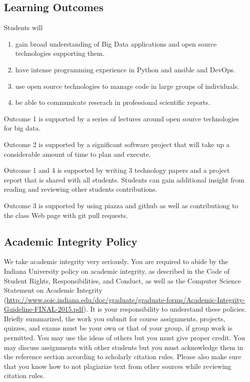 \subsection{Learning Outcomes}
\label{\detokenize{i524/index:learning-outcomes}}
Students will
\begin{enumerate}
\item {} 
gain broad understanding of Big Data applications and open source
technologies supporting them.

\item {} 
have intense programming experience in Python and ansible and DevOps.

\item {} 
use open source technologies to manage code in large groups of
individuals.

\item {} 
be able to communicate reserach in professional scientific reports.

\end{enumerate}

Outcome 1 is supported by a series of lectures around open source
technologies for big data.

Outcome 2 is supported by a significant software project that will
take up a considerable amount of time to plan and execute.

Outcome 1 and 4 is supported by writing 3 technology papers and a project
report that is shared with all students. Students can gain additional
insight from reading and reviewing other students contributions.

Outcome 3 is supported by using piazza and github as well as
contributiong to the class Web page with git pull requests.


\subsection{Academic Integrity Policy}
\label{\detokenize{i524/index:academic-integrity-policy}}
We take academic integrity very seriously. You are required to abide
by the Indiana University policy on academic integrity, as described
in the Code of Student Rights, Responsibilities, and Conduct, as well
as the Computer Science Statement on Academic Integrity
(\url{http://www.soic.indiana.edu/doc/graduate/graduate-forms/Academic-Integrity-Guideline-FINAL-2015.pdf}). It
is your responsibility to understand these policies. Briefly
summarized, the work you submit for course assignments, projects,
quizzes, and exams must be your own or that of your group, if group
work is permitted. You may use the ideas of others but you must give
proper credit. You may discuss assignments with other students but you
must acknowledge them in the reference section according to scholarly
citation rules. Please also make sure that you know how to not
plagiarize text from other sources while reviewing citation rules.

